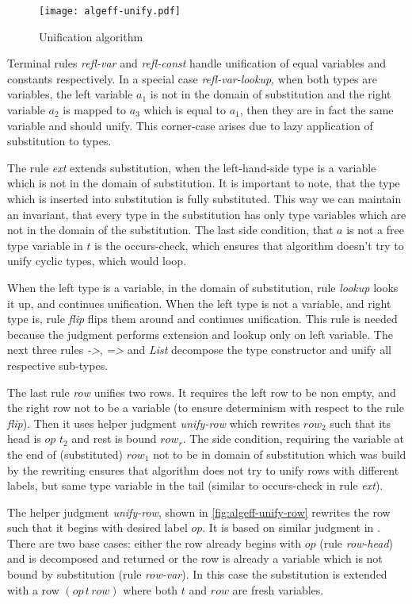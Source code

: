 \documentclass[inz, english, shortabstract]{iithesis}
\begin{document}
\begin{figure}[h]
  \centering
  \texttt{[image: algeff-unify.pdf]}
  \caption{Unification algorithm}
  \label{fig:algeff-unify}
\end{figure}

Terminal rules \emph{refl-var} and \emph{refl-const} handle unification of equal variables and constants respectively.
In a special case \emph{refl-var-lookup}, when both types are variables, the left variable $a_1$ is not in the domain of substitution and the right variable $a_2$ is mapped to $a_3$ which is equal to $a_1$, then they are in fact the same variable and should unify.
This corner-case arises due to lazy application of substitution to types.

The rule \emph{ext} extends substitution, when the left-hand-side type is a variable which is not in the domain of substitution.
It is important to note, that the type which is inserted into substitution is fully substituted.
This way we can maintain an invariant, that every type in the substitution has only type variables which are not in the domain of the substitution.
The last side condition, that $a$ is not a free type variable in $t$ is the occurs-check, which ensures that algorithm doesn't try to unify cyclic types, which would loop.

When the left type is a variable, in the domain of substitution, rule \emph{lookup} looks it up, and continues unification.
When the left type is not a variable, and right type is, rule \emph{flip} flips them around and continues unification.
This rule is needed because the judgment performs extension and lookup only on left variable.
The next three rules \emph{->}, \emph{=>} and \emph{List} decompose the type constructor and unify all respective sub-types.

The last rule \emph{row} unifies two rows.
It requires the left row to be non empty, and the right row not to be a variable (to ensure determinism with respect to the rule \emph{flip}).
Then it uses helper judgment \emph{unify-row} which rewrites $row_2$ such that its head is $op \, \, t_2$ and rest is bound $row_r$.
The side condition, requiring the variable at the end of (substituted) $row_1$ not to be in domain of substitution which was build by the rewriting ensures that algorithm does not try to unify rows with different labels, but same type variable in the tail (similar to occurs-check in rule \emph{ext}).

The helper judgment \emph{unify-row}, shown in \autoref{fig:algeff-unify-row} rewrites the row such that it begins with desired label $op$.
It is based on similar judgment in \cite{Leijen2005}.
There are two base cases: either the row already begins with $op$ (rule \emph{row-head}) and is decomposed and returned or the row is already a variable which is not bound by substitution (rule \emph{row-var}).
In this case the substitution is extended with a row $(op \, t \, row)$ where both $t$ and $row$ are fresh variables.
\end{document}
